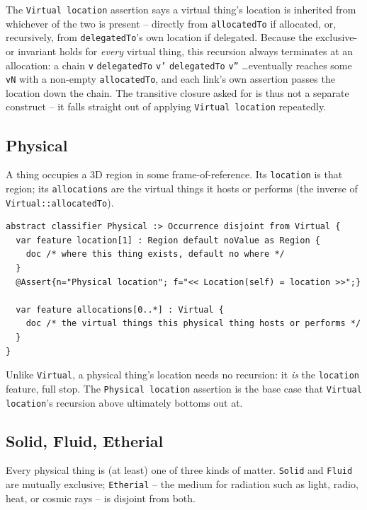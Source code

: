 \pn The \texttt{Virtual location} assertion says a virtual thing's location is inherited from
whichever of the two is present -- directly from \texttt{allocatedTo} if allocated, or,
recursively, from \texttt{delegatedTo}'s own location if delegated.  Because the exclusive-or
invariant holds for \emph{every} virtual thing, this recursion always terminates at an allocation: a
chain \texttt{v} \texttt{delegatedTo} \texttt{v'} \texttt{delegatedTo} \texttt{v''} \dots eventually
reaches some \texttt{vN} with a non-empty \texttt{allocatedTo}, and each link's own assertion passes
the location down the chain.  The transitive closure asked for is thus not a separate construct --
it falls straight out of applying \texttt{Virtual location} repeatedly.

\subsection{Physical}\label{subsec:physical}

\pn A  thing occupies a 3D region in some frame-of-reference.  Its
\texttt{location} is that region; its \texttt{allocations} are the virtual things it hosts or
performs (the inverse of \texttt{Virtual::allocatedTo}).

\begin{lstlisting}
abstract classifier Physical :> Occurrence disjoint from Virtual {
  var feature location[1] : Region default noValue as Region {
    doc /* where this thing exists, default no where */
  }
  @Assert{n="Physical location"; f="<< Location(self) = location >>";}

  var feature allocations[0..*] : Virtual {
    doc /* the virtual things this physical thing hosts or performs */
  }
}
\end{lstlisting}

\pn Unlike \texttt{Virtual}, a physical thing's location needs no recursion: it \emph{is} the
\texttt{location} feature, full stop.  The \texttt{Physical location} assertion is the base case
that \texttt{Virtual location}'s recursion above ultimately bottoms out at.

\subsection{Solid, Fluid, Etherial}\label{subsec:solidfluidetherial}

\pn Every physical thing is (at least) one of three kinds of matter.  \texttt{Solid} and
\texttt{Fluid} are mutually exclusive; \texttt{Etherial} -- the medium for radiation such as light,
radio, heat, or cosmic rays -- is disjoint from both.

